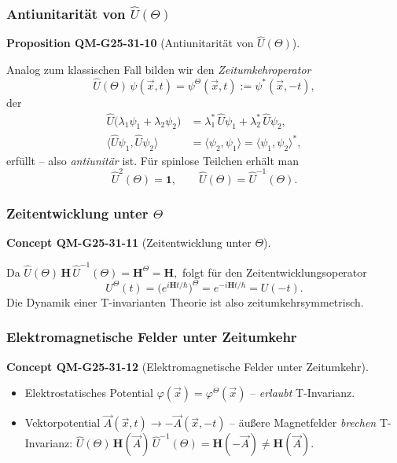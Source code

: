 \documentclass[10pt, letterpaper]{article}
\newcommand{\CustomHeading}[3]{%
  \par\medskip\noindent%
  \textbf{#1 #2} \textnormal{(#3)}.\enskip%
}
\newenvironment{PROP}[2]{\begin{unitbox}\CustomHeading{Proposition}{#1}{#2}}{\end{unitbox}}
\newenvironment{CONC}[2]{\begin{unitbox}\CustomHeading{Concept}{#1}{#2}}{\end{unitbox}}
\begin{document}
\subsubsection*{Antiunitarität von $\widehat U (\Theta)$}

\begin{PROP}{QM-G25-31-10}{Antiunitarität von $\widehat U (\Theta)$}
Analog zum klassischen Fall bilden wir den
\emph{Zeitumkehroperator}
\[
  \widehat U(\Theta)\,\psi(\vec x,t)
  =\psi^{\Theta}(\vec x,t)
  :=\psi^{*}(\vec x,-t),
\]
der
\begin{align*}
  \widehat U\bigl(\lambda_1\psi_1+\lambda_2\psi_2\bigr)
    &=\lambda_1^{*}\,\widehat U\psi_1
      +\lambda_2^{*}\,\widehat U\psi_2,
\\
  \bigl\langle\widehat U\psi_1,\widehat U\psi_2\bigr\rangle
    &=\langle\psi_2,\psi_1\rangle
    =\langle\psi_1,\psi_2\rangle^{*},
\end{align*}
erfüllt – also \emph{antiunitär} ist.
Für spinlose Teilchen erhält man
\[
  \widehat U^{2}(\Theta)=\mathbf 1,\qquad
  \widehat U(\Theta)=\widehat U^{-1}(\Theta).
\]
\end{PROP}

\subsubsection*{Zeitentwicklung unter $\Theta$}

\begin{CONC}{QM-G25-31-11}{Zeitentwicklung unter $\Theta$}
Da
\(
  \widehat U(\Theta)\,\mathbf H\,\widehat U^{-1}(\Theta)
  =\mathbf H^{\Theta}=\mathbf H,
\)
folgt für den Zeitentwicklungsoperator
\[
  U^{\Theta}(t)
  =\bigl(e^{i\mathbf H t/\hbar}\bigr)^{\Theta}
  =e^{-i\mathbf H t/\hbar}
  =U(-t).
\]
Die Dynamik einer T-invarianten Theorie ist also zeitumkehrsymmetrisch.
\end{CONC}

\subsubsection*{Elektromagnetische Felder unter Zeitumkehr}

\begin{CONC}{QM-G25-31-12}{Elektromagnetische Felder unter Zeitumkehr}
\begin{itemize}
\item
Elektrostatisches Potential
\(
  \varphi(\vec x)\!=\!\varphi^{\Theta}(\vec x)
\)
– \emph{erlaubt} T-Invarianz.

\item
Vektorpotential
\(
  \vec A(\vec x,t)\longrightarrow -\vec A(\vec x,-t)
\)
– äußere Magnetfelder \emph{brechen} T-Invarianz:
\(
  \widehat U(\Theta)\,\mathbf H(\vec A)\,\widehat U^{-1}(\Theta)
  =\mathbf H(-\vec A)\neq\mathbf H(\vec A).
\)
\end{itemize}
\end{CONC}
\end{document}
